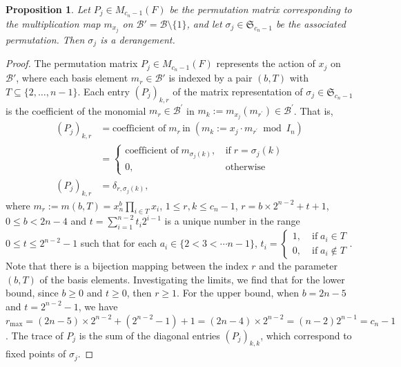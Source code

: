 \documentclass[11pt]{amsart}
\newcommand{\disp}{\displaystyle}
\theoremstyle{plain}
\newtheorem{prop}[theorem]{Proposition}
\theoremstyle{definition}
\theoremstyle{remark}
\begin{document}
\begin{prop}
	\label{prop:derangement}
	Let \( P_j \in M_{c_n-1}(F) \) be the permutation matrix corresponding to the multiplication map \( m_{x_j} \) on \( \mathcal{B}' = \mathcal{B} \setminus \{1\} \), and let \( \sigma_j \in \mathfrak{S}_{c_n-1} \) be the associated permutation. Then \( \sigma_j \) is a derangement. 
	
\end{prop}
\begin{proof}
	The permutation matrix \( P_j \in M_{c_n-1}(F) \) represents the action of \( x_j \) on \( \mathcal{B}' \), where each basis element \( m_r \in \mathcal{B}' \) is indexed by a pair \( (b, T) \) with \( T \subseteq \{2, \dots, n-1\} \). Each entry \( (P_j)_{k,r} \) of the matrix representation of \( \sigma_j \in \mathfrak{S}_{c_n-1} \) is the coefficient of the monomial \( m_r \in \mathcal{B}^{\prime} \) in \( m_k:=m_{x_j}(m_{r^{\prime}}) \in \mathcal{B}^{\prime}  \). That is,
	\begin{align*}
	(P_j)_{k,r} & = \text{coefficient of}\; m_r\, \text{in}\; (m_k:=x_j\cdot m_{r^{\prime}} \bmod{ I_n})\\ & = \begin{cases}
	 \text{coefficient of}\; m_{\sigma_j(k)},\, & \text{if}\; r=\sigma_j(k)\\ 0, & \text{otherwise}
	\end{cases}\\ (P_j)_{k,r} & = \delta_{r,\sigma_j(k)},
	\end{align*} where \( \disp m_{r} := m(b,T) = x_n^{b} \prod_{i \in T} x_i \), \( 1 \leq r, k \leq c_n-1 \), \( r = b \times 2^{n-2} + t + 1 \), \( 0 \leq b < 2n-4 \) and \( \disp t = \sum_{i=1}^{n-2} t_i2^{i-1} \) is a unique number in the range \( 0 \leq t \leq 2^{n-2}-1 \) such that for each \( a_i \in \{ 2 < 3 < \cdots n-1 \} \), \( t_i = \begin{cases}
	1, \; & \text{if}\; a_i\in T\\ 0, \; & \text{if}\; a_i \notin T
	\end{cases} \). Note that there is a bijection mapping between the index \( r \) and the parameter \( (b, T )\) of the basis elements. Investigating the limits, we find that for the lower bound, since \( b \geq 0 \) and \( t \geq 0 \), then \( r \geq 1 \). For the upper bound, when \( b = 2n-5 \) and \( t = 2^{n-2}-1 \), we have \( r_{\max} =(2n-5) \times 2^{n-2} +(2^{n-2} -1) + 1 = (2n -4) \times 2^{n-2} =(n-2)2^{n-1} =c_n-1 \). The trace of \( P_j \) is the sum of the diagonal entries \( (P_j)_{k,k} \), which correspond to fixed points of \( \sigma_j \).
	

\end{proof}
\end{document}
